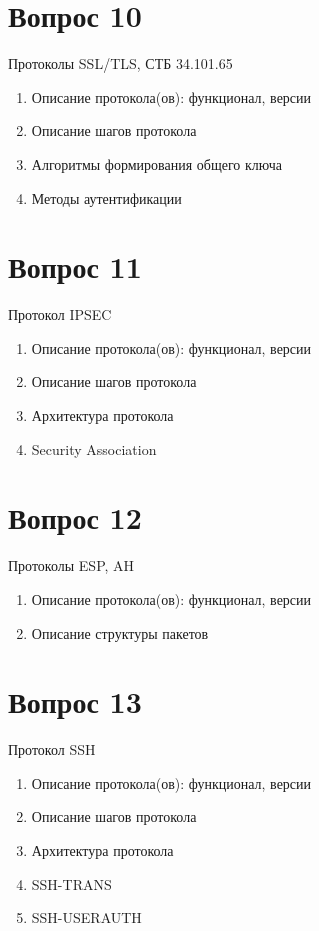 \documentclass[a4paper,12pt]{article}
\begin{document}
	\section{Вопрос 10}
	Протоколы SSL/TLS, СТБ 34.101.65
	\begin{enumerate}
		\item Описание протокола(ов): функционал, версии
		\item Описание шагов протокола
		\item Алгоритмы  формирования  общего  ключа
		\item Методы  аутентификации
	\end{enumerate}
	\newpage
	
	\section{Вопрос 11}
	Протокол IPSEC
	\begin{enumerate}
		\item Описание протокола(ов): функционал, версии
		\item Описание шагов протокола
		\item Архитектура протокола
		\item Security Association
	\end{enumerate}
	\newpage
	
	\section{Вопрос 12}
	Протоколы ESP, AH
	\begin{enumerate}
		\item Описание протокола(ов): функционал, версии
		\item Описание структуры пакетов
	\end{enumerate}
	\newpage
	
	\section{Вопрос 13}
	Протокол SSH
	\begin{enumerate}
		\item Описание протокола(ов): функционал, версии
		\item Описание шагов протокола
		\item Архитектура протокола
		\item SSH-TRANS
		\item SSH-USERAUTH
	\end{enumerate}
	\newpage
	
\end{document}
